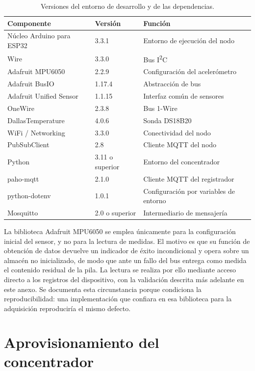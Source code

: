 \begin{table}[ht!]
\caption{Versiones del entorno de desarrollo y de las dependencias.}
\label{table:dependencias}
\centering
\begin{tabular}{|p{5.4cm}|p{2.4cm}|p{4.4cm}|}
\hline
\textbf{Componente} & \textbf{Versión} & \textbf{Función} \\
\hline
Núcleo Arduino para ESP32 & 3.3.1 & Entorno de ejecución del nodo \\
\hline
Wire & 3.3.0 & Bus I\textsuperscript{2}C \\
\hline
Adafruit MPU6050 & 2.2.9 & Configuración del acelerómetro \\
\hline
Adafruit BusIO & 1.17.4 & Abstracción de bus \\
\hline
Adafruit Unified Sensor & 1.1.15 & Interfaz común de sensores \\
\hline
OneWire & 2.3.8 & Bus 1-Wire \\
\hline
DallasTemperature & 4.0.6 & Sonda DS18B20 \\
\hline
WiFi / Networking & 3.3.0 & Conectividad del nodo \\
\hline
PubSubClient & 2.8 & Cliente MQTT del nodo \\
\hline
Python & 3.11 o superior & Entorno del concentrador \\
\hline
paho-mqtt & 2.1.0 & Cliente MQTT del registrador \\
\hline
python-dotenv & 1.0.1 & Configuración por variables de entorno \\
\hline
Mosquitto & 2.0 o superior & Intermediario de mensajería \\
\hline
\end{tabular}
\end{table}

La biblioteca Adafruit MPU6050 se emplea únicamente para la configuración inicial del
sensor, y no para la lectura de medidas. El motivo es que su función de obtención de datos
devuelve un indicador de éxito incondicional y opera sobre un almacén no inicializado, de
modo que ante un fallo del bus entrega como medida el contenido residual de la pila. La
lectura se realiza por ello mediante acceso directo a los registros del dispositivo, con la validación descrita más adelante en este anexo. Se documenta esta circunstancia porque
condiciona la reproducibilidad: una implementación que confiara en esa biblioteca para la
adquisición reproduciría el mismo defecto.

\section{Aprovisionamiento del concentrador}

